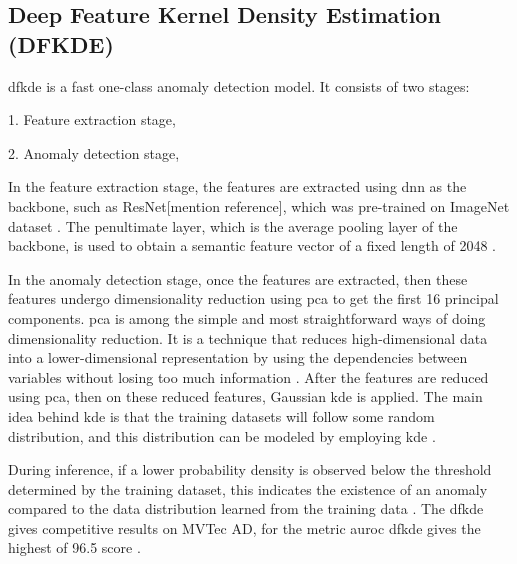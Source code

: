 \subsection{Deep Feature Kernel Density Estimation (DFKDE)}
\label{subsec:dfkde}

\gls{dfkde} is a fast one-class anomaly detection model. It consists of two stages:

1. Feature extraction stage,

2. Anomaly detection stage,

In the feature extraction stage, the features are extracted using \gls{dnn} as the backbone, such as ResNet[mention reference], which was pre-trained on ImageNet\cite{5206848} dataset \cite{10208786}. The penultimate layer, which is the average pooling layer of the backbone, is used to obtain a semantic feature vector of a fixed length of 2048 \cite{Anomalib2024}.

In the anomaly detection stage, once the features are extracted, then these features undergo dimensionality reduction using \gls{pca}\cite{IBM2023} to get the first 16 principal components. \gls{pca} is among the simple and most straightforward ways of doing dimensionality reduction. It is a technique that reduces high-dimensional data into a lower-dimensional representation by using the dependencies between variables without losing too much information \cite{Shalizi2012}. After the features are reduced using \gls{pca}, then on these reduced features, Gaussian \gls{kde} is applied. The main idea behind \gls{kde} is that the training datasets will follow some random distribution, and this distribution can be modeled by employing \gls{kde} \cite{10208786}.

During inference, if a lower probability density is observed below the threshold determined by the training dataset, this indicates the existence of an anomaly compared to the data distribution learned from the training data \cite{10208786}. The \gls{dfkde} gives competitive results on MVTec AD\cite{8954181}, for the metric \gls{auroc} \gls{dfkde} gives the highest of 96.5 score \cite{Anomalib2024}.

